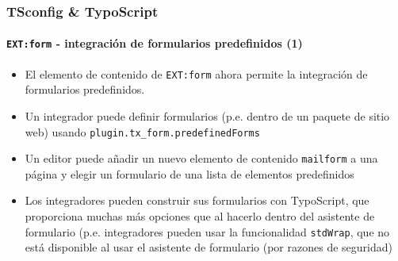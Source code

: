 \begin{frame}[fragile]
	\frametitle{TSconfig \& TypoScript}
	\framesubtitle{\texttt{EXT:form} - integración de formularios predefinidos (1)}

	\lstset{basicstyle=\tiny\ttfamily}

	\begin{itemize}

		\item El elemento de contenido de \texttt{EXT:form} ahora permite la integración de
			formularios predefinidos.

		\item Un integrador puede definir formularios (p.e. dentro de un paquete de sitio web) usando
			\texttt{plugin.tx\_form.predefinedForms}

		\item Un editor puede añadir un nuevo elemento de contenido \texttt{mailform} a una página y
			elegir un formulario de una lista de elementos predefinidos

		\item Los integradores pueden construir sus formularios con TypoScript, que proporciona muchas más
			opciones que al hacerlo dentro del asistente de formulario (p.e. integradores pueden
			usar la funcionalidad \texttt{stdWrap}, que no está disponible al usar el
			asistente de formulario (por razones de seguridad)

	\end{itemize}

\end{frame}


